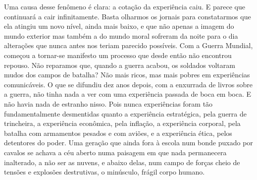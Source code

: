 Uma causa desse fenômeno é clara: a cotação da experiência caiu. E
parece que continuará a cair infinitamente. Basta olharmos os jornais
para constatarmos que ela atingiu um novo nível, ainda mais baixo, e que não
apenas a imagem do mundo exterior mas também a do mundo moral sofreram
da noite para o dia alterações que nunca antes nos teriam parecido
possíveis. Com a Guerra Mundial, começou a tornar-se manifesto um
processo que desde então não encontrou repouso. Não reparamos que,
quando a guerra acabou, os soldados voltaram mudos dos campos de
batalha? Não mais ricos, mas mais pobres em experiências comunicáveis. O
que se difundiu dez anos depois, com a enxurrada de livros sobre a
guerra, não tinha nada a ver com uma experiência passada de boca em
boca. E não havia nada de estranho nisso. Pois nunca experiências foram
tão fundamentalmente desmentidas quanto a experiência estratégica, pela
guerra de trincheira, a experiência econômica, pela inflação, a
experiência corporal, pela batalha com armamentos pesados e com aviões,
e a experiência ética, pelos detentores do poder. Uma geração que ainda
fora à escola num bonde puxado por cavalos se achava a céu aberto numa
paisagem em que nada permanecera inalterado, a não ser as nuvens, e
abaixo delas, num campo de forças cheio de tensões e explosões
destrutivas, o minúsculo, frágil corpo humano.

\section{}

